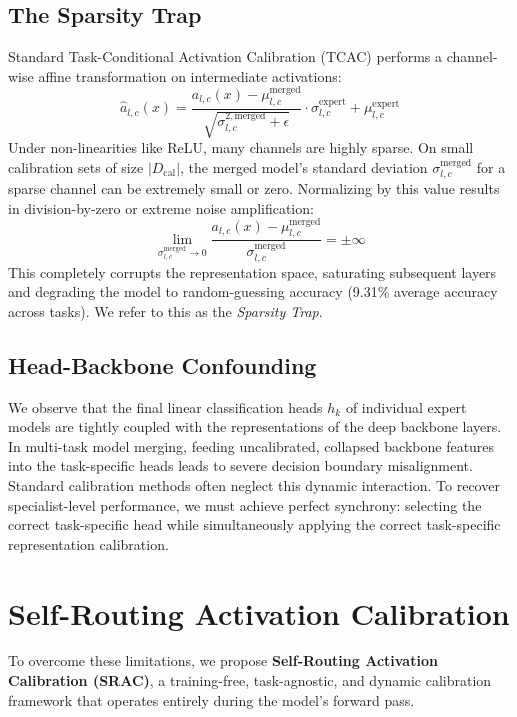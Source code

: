 \documentclass{article}
\theoremstyle{plain}
\theoremstyle{definition}
\theoremstyle{remark}
\begin{document}
\subsection{The Sparsity Trap}
Standard Task-Conditional Activation Calibration (TCAC) performs a channel-wise affine transformation on intermediate activations:
\begin{equation}
  \hat{a}_{l,c}(x) = \frac{a_{l,c}(x) - \mu_{l,c}^{\text{merged}}}{\sqrt{\sigma_{l,c}^{2, \text{merged}} + \epsilon}} \cdot \sigma_{l,c}^{\text{expert}} + \mu_{l,c}^{\text{expert}}
\end{equation}
Under non-linearities like ReLU, many channels are highly sparse. On small calibration sets of size $|D_{\text{cal}}|$, the merged model's standard deviation $\sigma_{l,c}^{\text{merged}}$ for a sparse channel can be extremely small or zero. Normalizing by this value results in division-by-zero or extreme noise amplification:
\begin{equation}
  \lim_{\sigma_{l,c}^{\text{merged}} \to 0} \frac{a_{l,c}(x) - \mu_{l,c}^{\text{merged}}}{\sigma_{l,c}^{\text{merged}}} = \pm \infty
\end{equation}
This completely corrupts the representation space, saturating subsequent layers and degrading the model to random-guessing accuracy (9.31\% average accuracy across tasks). We refer to this as the \emph{Sparsity Trap}.

\subsection{Head-Backbone Confounding}
We observe that the final linear classification heads $h_k$ of individual expert models are tightly coupled with the representations of the deep backbone layers. In multi-task model merging, feeding uncalibrated, collapsed backbone features into the task-specific heads leads to severe decision boundary misalignment. Standard calibration methods often neglect this dynamic interaction. To recover specialist-level performance, we must achieve perfect synchrony: selecting the correct task-specific head while simultaneously applying the correct task-specific representation calibration.

\section{Self-Routing Activation Calibration}
\label{sec:method}

To overcome these limitations, we propose \textbf{Self-Routing Activation Calibration (SRAC)}, a training-free, task-agnostic, and dynamic calibration framework that operates entirely during the model's forward pass.
\end{document}
